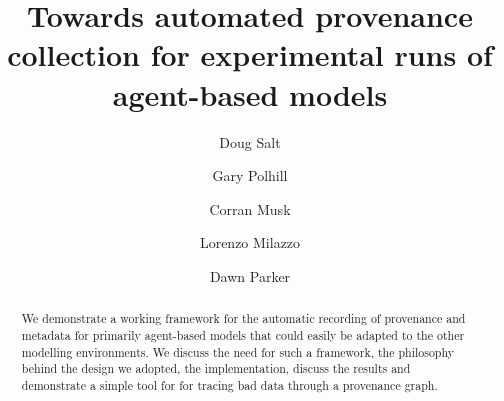 \documentclass[runningheads]{llncs}
\begin{document}
%
\title{Towards automated provenance collection for experimental runs of agent-based models}

%
%
\author{Doug Salt  \and
 Gary Polhill  \and
 Corran Musk \and
 Lorenzo Milazzo \and
 Dawn Parker   }

%
%
%
\maketitle              %
%
\begin{abstract}
    We demonstrate a working framework for the automatic recording of
    provenance and metadata for primarily agent-based models that could easily
    be adapted to the other modelling environments. We discuss the need for
    such a framework, the philosophy behind the design we adopted, the
    implementation, discuss the results and demonstrate a simple tool for for
    tracing bad data through a provenance graph.

\end{abstract}
%
%
%
\end{document}

